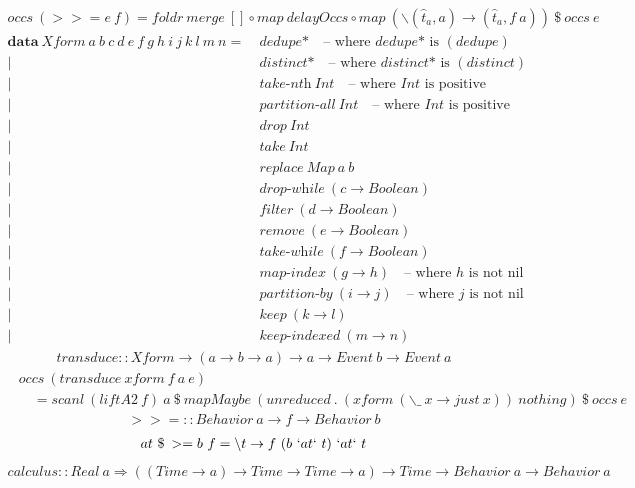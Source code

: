 \documentclass[fleqn]{amsart}
\newcommand{\zeroarity}[1]{&\ \textit{#1*}\quad\text{-- where }\textit{#1*}\text{ is }(#1)}
\newcommand{\positive}[1]{&\ \textit{#1}\ Int\quad\text{-- where }Int\text{ is positive}}
\newcommand{\integer}[1]{&\ #1\ Int}
\newcommand{\predicate}[2]{&\ \textit{#1}\ (#2 \rightarrow Boolean)}
\newcommand{\nonnillable}[3]{&\ \textit{#1}\ (#2 \rightarrow #3)\quad\text{-- where }#3\text{ is not nil}}
\newcommand{\any}[3]{&\ \textit{#1}\ (#2 \rightarrow #3)}
\begin{document}
\begin{align*}
  occs\ (>>= e\ f) = foldr\ merge\ []\circ map\ delayOccs\circ map\ (\backslash(\hat{t}_a, a) \rightarrow (\hat{t}_a , f\ a))\ \$ \ occs\ e
\end{align*}
\begin{align*}
  \mathbf{data}\ Xform\ a\ b\ c\ d\ e\ f\ g\ h\ i\ j\ k\ l\ m\ n =\zeroarity{dedupe}\\
  |\zeroarity{distinct}\\
  |\positive{take-nth}\\
  |\positive{partition-all}\\
  |\integer{drop}\\
  |\integer{take}\\
  |&\ replace\ Map\ a\ b\\
  |\predicate{drop-while}{c}\\
  |\predicate{filter}{d}\\
  |\predicate{remove}{e}\\
  |\predicate{take-while}{f}\\
  |\nonnillable{map-index}{g}{h}\\
  |\nonnillable{partition-by}{i}{j}\\
  |\any{keep}{k}{l}\\
  |\any{keep-indexed}{m}{n}
\end{align*}
\begin{align*}
  transduce :: Xform \rightarrow (a \rightarrow b \rightarrow a) \rightarrow a \rightarrow Event\ b \rightarrow Event\ a
\end{align*}
\begin{align*}
  &occs\ (transduce\ xform\ f\ a\ e)\\
  &\quad= scanl\ (liftA2\ f)\ a\ \$\ mapMaybe\ (unreduced\ .\ (xform\ (\backslash\_\ x\rightarrow just\ x))\ nothing)\ \$\ occs\ e
\end{align*}
\begin{align*}
  >>= :: Behavior\ a \rightarrow f \rightarrow Behavior\ b
\end{align*}
\begin{align*}
  at\ \$\>>= b\ f =\backslash t \rightarrow f\ (b\ `at` \ t)\ `at` \ t
\end{align*}
\begin{align*}
  calculus :: Real\ a\Rightarrow ((Time \rightarrow a) \rightarrow Time \rightarrow Time \rightarrow a) \rightarrow Time \rightarrow Behavior\ a\rightarrow Behavior\ a
\end{align*}
\end{document}
